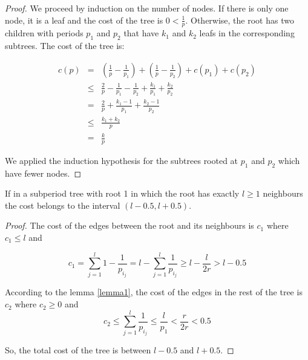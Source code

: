 \begin{proof}
We proceed by induction on the number of nodes. If there is only one node, it is a leaf and the cost of the tree is $0<\frac 1p$. Otherwise, the root has two children with periods $p_1$ and $p_2$ that have $k_1$ and $k_2$ leafs in the corresponding subtrees. The cost of the tree is: 

\begin{eqnarray*}
c(p) &=& \left(\frac 1p - \frac 1 {p_1}\right) + \left(\frac 1 p - \frac 1 {p_2}\right)+c(p_1)+c(p_2) \\
    &\leq & \frac 2p-\frac 1 {p_1}-\frac 1 {p_2} + \frac {k_1}{p_1}+\frac {k_2}{p_2} \\
    &=&\frac 2p + \frac{k_1-1}{p_1}+\frac{k_2-1}{p_2} \\
    &\leq & \frac{k_1+k_2}p \\
    &=&\frac kp
\end{eqnarray*}

We applied the induction hypothesis for the subtrees rooted at $p_1$ and $p_2$ which have fewer nodes. 
\end{proof}

\begin{lemma}\label{lemma2}
If in a subperiod tree with root 1 in which the root has exactly $l \ge 1$ neighbours the cost belongs to the interval $(l-0.5,l+0.5)$.
\end{lemma}
\begin{proof}
The cost of the edges between the root and its neighbours is $c_1$ where $c_1 \le l$ and 

$$c_1 = \sum_{j=1}^{l} 1-\frac 1 {p_{i_j}}  = l - \sum_{j=1}^l \frac 1 {p_{i_j}} \geq l-\frac l {2r} >l-0.5$$

According to the lemma \ref{lemma1}, the cost of the edges in the rest of the tree is $c_2$ where $c_2 \ge 0$ and 
$$c_2 \le \sum_{j=1}^l \frac 1 {p_{i_j}} \leq \frac l {p_1} < \frac r {2r} < 0.5$$

So, the total cost of the tree is between $l-0.5$ and $l+0.5$.
\end{proof}

